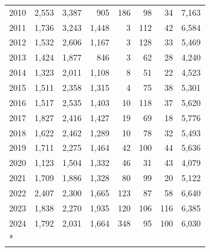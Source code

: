 \documentclass[
  english,
]{article}
\begin{document}
\begin{longtable}[t]{lrrrrrrr}
2010 & 2,553 & 3,387 & 905 & 186 & 98 & 34 & 7,163\\
2011 & 1,736 & 3,243 & 1,448 & 3 & 112 & 42 & 6,584\\
2012 & 1,532 & 2,606 & 1,167 & 3 & 128 & 33 & 5,469\\
2013 & 1,424 & 1,877 & 846 & 3 & 62 & 28 & 4,240\\
2014 & 1,323 & 2,011 & 1,108 & 8 & 51 & 22 & 4,523\\
2015 & 1,511 & 2,358 & 1,315 & 4 & 75 & 38 & 5,301\\
2016 & 1,517 & 2,535 & 1,403 & 10 & 118 & 37 & 5,620\\
2017 & 1,827 & 2,416 & 1,427 & 19 & 69 & 18 & 5,776\\
2018 & 1,622 & 2,462 & 1,289 & 10 & 78 & 32 & 5,493\\
2019 & 1,711 & 2,275 & 1,464 & 42 & 100 & 44 & 5,636\\
2020 & 1,123 & 1,504 & 1,332 & 46 & 31 & 43 & 4,079\\
2021 & 1,709 & 1,886 & 1,328 & 80 & 99 & 20 & 5,122\\
2022 & 2,407 & 2,300 & 1,665 & 123 & 87 & 58 & 6,640\\
2023 & 1,838 & 2,270 & 1,935 & 120 & 106 & 116 & 6,385\\
2024 & 1,792 & 2,031 & 1,664 & 348 & 95 & 100 & 6,030\\*

\end{longtable}

\endgroup{}

\pagebreak
\end{document}
